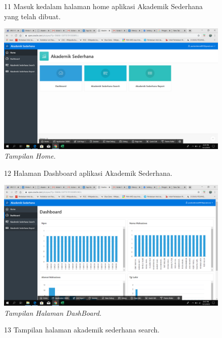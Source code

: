 \begin{enumerate}
\begin{figure}
\item[11] Masuk kedalam halaman home aplikasi Akademik Sederhana yang telah dibuat.

    \begin{center}
\includegraphics[scale=0.2]{figures/ss11.png}
    \caption{\textit{Tampilan Home.}}
        \end{center}
\label{gambar}
\end{figure}

\begin{figure}
\item[12] Halaman Dashboard aplikasi Akademik Sederhana.

    \begin{center}
\includegraphics[scale=0.2]{figures/ss12.png}
    \caption{\textit{Tampilan Halaman DashBoard.}}
        \end{center}
\label{gambar}
\end{figure}

\begin{figure}
\item[13] Tampilan halaman akademik sederhana search.


\end{figure}
\end{enumerate}
